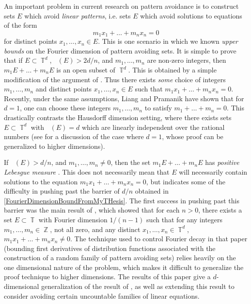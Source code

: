 \documentclass[dvipsnames,letterpaper,12pt]{article}
\numberwithin{equation}{section}
\DeclareMathOperator{\hausdim}{\dim_{\mathbb{H}}}
\DeclareMathOperator{\fordim}{\dim_{\mathbb{F}}}
\DeclareMathOperator{\ZZ}{\mathbb{Z}}
\DeclareMathOperator{\TT}{\mathbb{T}}
\numberwithin{theorem}{section}
\begin{document}
An important problem in current research on pattern avoidance is to construct sets $E$ which avoid \emph{linear patterns}, i.e. sets $E$ which avoid solutions to equations of the form
%
\begin{equation}
    m_1x_1 + \dots + m_nx_n = 0
\end{equation}
%
for distinct points $x_1,\dots,x_n \in E$.
%
%
This is one scenario in which we known \emph{upper bounds} on the Fourier dimension of pattern avoiding sets. It is simple to prove that if $E \subset \TT^d$, $\fordim(E) > 2d/n$, and $m_1,\dots,m_n$ are non-zero integers, then $m_1 E + \dots + m_n E$ is an open subset of $\TT^d$. This is obtained by a simple modification of the argument of \cite[Proposition 3.14]{MattilaFourier}. Thus there exists \emph{some} choice of integers $m_1,\dots,m_n$ and distinct points $x_1,\dots,x_n \in E$ such that $m_1x_1 + \dots + m_nx_n = 0$. Recently, under the same assumptions, Liang and Pramanik \cite{LiangPramanik} have shown that for $d = 1$, one can choose these integers $m_1,\dots,m_n$ to satisfy $m_1 + \dots + m_n = 0$. This drastically contrasts the Hausdorff dimension setting, where there exists sets $E \subset \TT^d$ with $\hausdim(E) = d$ which are linearly independent over the rational numbers (see \cite{Keleti} for a discussion of the case where $d = 1$, whose proof can be generalized to higher dimensions).

If $\fordim(E) > d/n$, and $m_1,\dots,m_n \neq 0$, then the set $m_1 E + \dots + m_n E$ has \emph{positive Lebesgue measure} \cite[Proposition 3.14]{MattilaFourier}. This does not necessarily mean that $E$ will necessarily contain solutions to the equation $m_1x_1 + \dots + m_nx_n = 0$, but indicates some of the difficulty in pushing past the barrier of $d/n$ obtained in \eqref{FourierDimensionBoundFromMyTHesis}. The first success in pushing past this barrier was the main result of \cite{Korner2}, which showed that for each $n > 0$, there exists a set $E \subset \TT$ with Fourier dimension $1/(n-1)$ such that for any integers $m_1,\dots,m_n \in \ZZ$, not all zero, and any distinct $x_1,\dots,x_n \in \TT^d$, $m_1x_1 + \dots + m_nx_n \neq 0$. The technique used to control Fourier decay in that paper (bounding first derivatives of distribution functions associated with the construction of a random family of pattern avoiding sets) relies heavily on the one dimensional nature of the problem, which makes it difficult to generalize the proof technique to higher dimensions. The results of this paper give a $d$-dimensional generalization of the result of \cite{Korner2}, as well as extending this result to consider avoiding certain uncountable families of linear equations.
\end{document}

